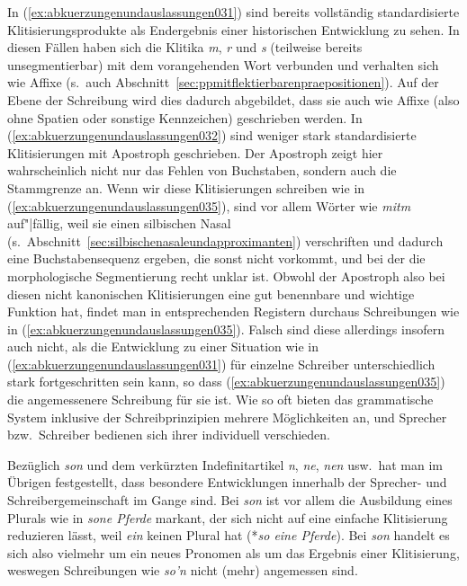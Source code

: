 In (\ref{ex:abkuerzungenundauslassungen031}) sind bereits vollständig standardisierte Klitisierungsprodukte als Endergebnis einer historischen Entwicklung zu sehen.
In diesen Fällen haben sich die Klitika \textit{m}, \textit{r} und \textit{s} (teilweise bereits unsegmentierbar) mit dem vorangehenden Wort verbunden und verhalten sich wie Affixe (s.\ auch Abschnitt~\ref{sec:ppmitflektierbarenpraepositionen}).
Auf der Ebene der Schreibung wird dies dadurch abgebildet, dass sie auch wie Affixe (also ohne Spatien oder sonstige Kennzeichen) geschrieben werden.
In (\ref{ex:abkuerzungenundauslassungen032}) sind weniger stark standardisierte Klitisierungen mit Apostroph geschrieben.
Der Apostroph zeigt hier wahrscheinlich nicht nur das Fehlen von Buchstaben, sondern auch die Stammgrenze an.
Wenn wir diese Klitisierungen schreiben wie in (\ref{ex:abkuerzungenundauslassungen035}), sind vor allem Wörter wie \textit{mitm} auf"|fällig, weil sie einen silbischen Nasal (s.\ Abschnitt~\ref{sec:silbischenasaleundapproximanten}) verschriften und dadurch eine Buchstabensequenz ergeben, die sonst nicht vorkommt, und bei der die morphologische Segmentierung recht unklar ist.
Obwohl der Apostroph also bei diesen nicht kanonischen Klitisierungen eine gut benennbare und wichtige Funktion hat, findet man in entsprechenden Registern durchaus Schreibungen wie in (\ref{ex:abkuerzungenundauslassungen035}).
Falsch sind diese allerdings insofern auch nicht, als die Entwicklung zu einer Situation wie in (\ref{ex:abkuerzungenundauslassungen031}) für einzelne Schreiber unterschiedlich stark fortgeschritten sein kann, so dass (\ref{ex:abkuerzungenundauslassungen035}) die angemessenere Schreibung für sie ist.
Wie so oft bieten das grammatische System inklusive der Schreibprinzipien mehrere Möglichkeiten an, und Sprecher bzw.\ Schreiber bedienen sich ihrer individuell verschieden.

Bezüglich \textit{son} und dem verkürzten Indefinitartikel \textit{n}, \textit{ne}, \textit{nen} usw.\ hat man im Übrigen festgestellt, dass besondere Entwicklungen innerhalb der Sprecher- und Schreibergemeinschaft im Gange sind.
Bei \textit{son} ist vor allem die Ausbildung eines Plurals wie in \textit{sone Pferde} markant, der sich nicht auf eine einfache Klitisierung reduzieren lässt, weil \textit{ein} keinen Plural hat (*\textit{so eine Pferde}).
Bei \textit{son} handelt es sich also vielmehr um ein neues Pronomen als um das Ergebnis einer Klitisierung, weswegen Schreibungen wie \textit{so'n} nicht (mehr) angemessen sind.

